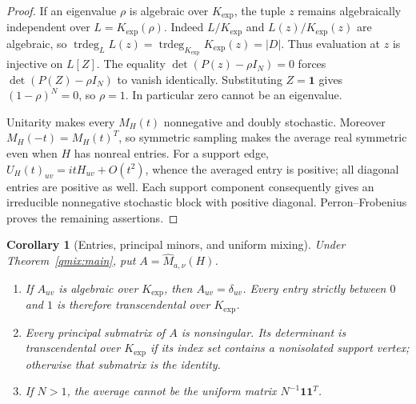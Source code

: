 \documentclass[11pt]{article}
\newtheorem{corollary}[theorem]{Corollary}
\theoremstyle{definition}
\theoremstyle{remark}
\newcommand{\Kexp}{K_{\mathrm{exp}}}
\newcommand{\trdeg}{\operatorname{trdeg}}
\begin{document}
\begin{proof}
If an eigenvalue $\rho$ is algebraic over $\Kexp$, the tuple $z$
remains algebraically independent over $L=\Kexp(\rho)$.
Indeed $L/\Kexp$ and $L(z)/\Kexp(z)$ are algebraic, so
$\trdeg_L L(z)=\trdeg_{\Kexp}\Kexp(z)=|D|$.
Thus evaluation at $z$ is injective on $L[Z]$. The equality
$\det(P(z)-\rho I_N)=0$ forces $\det(P(Z)-\rho I_N)$ to vanish
identically. Substituting $Z=\mathbf1$ gives $(1-\rho)^N=0$,
so $\rho=1$. In particular zero cannot be an eigenvalue.

Unitarity makes every $M_H(t)$ nonnegative and doubly stochastic.
Moreover $M_H(-t)=M_H(t)^T$, so symmetric sampling makes the average
real symmetric even when $H$ has nonreal entries.
For a support edge, $U_H(t)_{uv}=itH_{uv}+O(t^2)$, whence the
averaged entry is positive; all diagonal entries are positive as well.
Each support component consequently gives an irreducible nonnegative
stochastic block with positive diagonal. Perron--Frobenius proves the
remaining assertions.
\end{proof}

\begin{corollary}[Entries, principal minors, and uniform mixing]
\label{qmix:principal}
Under Theorem~\ref{qmix:main}, put $A=\widehat M_{a,\nu}(H)$.
\begin{enumerate}
\item If $A_{uv}$ is algebraic over $\Kexp$, then $A_{uv}=\delta_{uv}$.
Every entry strictly between $0$ and $1$ is therefore transcendental
over $\Kexp$.
\item Every principal submatrix of $A$ is nonsingular. Its determinant
is transcendental over $\Kexp$ if its index set contains a nonisolated
support vertex; otherwise that submatrix is the identity.
\item If $N>1$, the average cannot be the uniform matrix
$N^{-1}\mathbf1\mathbf1^T$.
\end{enumerate}
\end{corollary}
\end{document}
